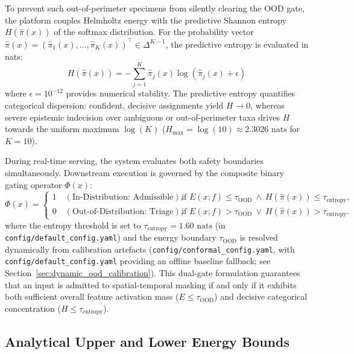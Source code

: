 To prevent such out-of-perimeter specimens from silently clearing the OOD gate, the platform couples Helmholtz energy with the predictive Shannon entropy $H(\hat{\pi}(x))$ of the softmax distribution. For the probability vector $\hat{\pi}(x) = (\hat{\pi}_1(x), \dots, \hat{\pi}_K(x))^\top \in \Delta^{K-1}$, the predictive entropy is evaluated in nats:
\begin{equation}
H(\hat{\pi}(x)) = -\sum_{j=1}^{K} \hat{\pi}_j(x) \log \left( \hat{\pi}_j(x) + \epsilon \right)
\label{eq:shannon_entropy}
\end{equation}
where $\epsilon = 10^{-12}$ provides numerical stability. The predictive entropy quantifies categorical dispersion: confident, decisive assignments yield $H \to 0$, whereas severe epistemic indecision over ambiguous or out-of-perimeter taxa drives $H$ towards the uniform maximum $\log(K)$ ($H_{\max} = \log(10) \approx 2.3026\text{ nats}$ for $K = 10$).

During real-time serving, the system evaluates both safety boundaries simultaneously. Downstream execution is governed by the composite binary gating operator $\Phi(x)$:
\begin{equation}
\Phi(x) = 
\begin{cases}
    1 \quad (\text{In-Distribution: Admissible}), & \text{if } E(x; f) \le \tau_{\text{OOD}} \ \wedge \ H(\hat{\pi}(x)) \le \tau_{\text{entropy}}, \\
    0 \quad (\text{Out-of-Distribution: Triage}), & \text{if } E(x; f) > \tau_{\text{OOD}} \ \vee \ H(\hat{\pi}(x)) > \tau_{\text{entropy}}.
\end{cases}
\label{eq:dual_ood_gate}
\end{equation}
where the entropy threshold is set to $\tau_{\text{entropy}} = 1.60\text{ nats}$ (in \nolinkurl{config/default_config.yaml}) and the energy boundary $\tau_{\text{OOD}}$ is resolved dynamically from calibration artefacts (\nolinkurl{config/conformal_config.yaml}, with \nolinkurl{config/default_config.yaml} providing an offline baseline fallback; see Section~\ref{sec:dynamic_ood_calibration}). This dual-gate formulation guarantees that an input is admitted to spatial-temporal masking if and only if it exhibits both sufficient overall feature activation mass ($E \le \tau_{\text{OOD}}$) and decisive categorical concentration ($H \le \tau_{\text{entropy}}$).

\subsection{Analytical Upper and Lower Energy Bounds}
\label{subsec:energy_calibration_math}

